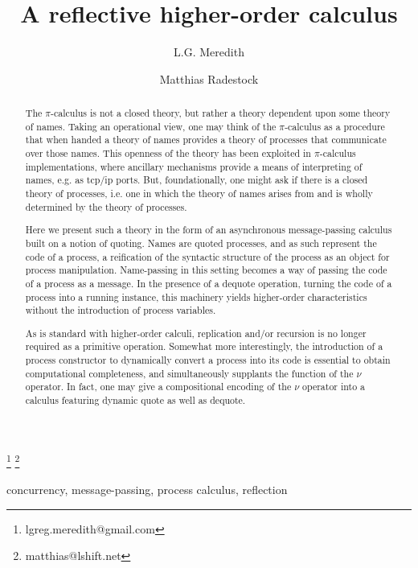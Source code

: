 \documentclass[]{entcs}
\newcommand{\pic}{$\pi$-calculus}
\begin{document}
\begin{frontmatter}
	\title{A reflective higher-order calculus}

	\author{ L.G. Meredith  }
	\address{ CTO, Djinnisys Corporation\\ 505 N72nd St, Seattle, WA 98103 }
	\author{ Matthias Radestock  }	
	\address{ CTO, LShift, Ltd.\\ 6 Rufus St, London N1 6PE }
	\thanks[lgmemail]{ lgreg.meredith@gmail.com }
	\thanks[mremail]{ matthias@lshift.net }


	\begin{abstract}
	The {\pic} is not a closed theory, but rather a theory dependent upon
	some theory of names. Taking an operational view, one may think of the
	{\pic} as a procedure that when handed a theory of names provides
	a theory of processes that communicate over those names. This openness
	of the theory has been exploited in {\pic} implementations, where
	ancillary mechanisms provide a means of interpreting of names, e.g. as
	tcp/ip ports. But, foundationally, one might ask if there is a closed
	theory of processes, i.e. one in which the theory of names arises from
	and is wholly determined by the theory of processes.
	
	Here we present such a theory in the form of an asynchronous
	message-passing calculus built on a notion of quoting. Names are
	quoted processes, and as such represent the code of a process, a
	reification of the syntactic structure of the process as an object for
	process manipulation. Name-passing in this setting becomes a way of
	passing the code of a process as a message. In the presence of a
	dequote operation, turning the code of a process into a running
	instance, this machinery yields higher-order characteristics without
	the introduction of process variables.
	
	As is standard with higher-order calculi, replication and/or recursion
	is no longer required as a primitive operation. Somewhat more
	interestingly, the introduction of a process constructor to
	dynamically convert a process into its code is essential to obtain
	computational completeness, and simultaneously supplants the function
	of the $\nu$ operator. In fact, one may give a compositional encoding
	of the $\nu$ operator into a calculus featuring dynamic quote as well as
	dequote.
	\end{abstract}

	\begin{keyword}
		concurrency, message-passing, process calculus, reflection
	\end{keyword}

\end{frontmatter}
\end{document}
